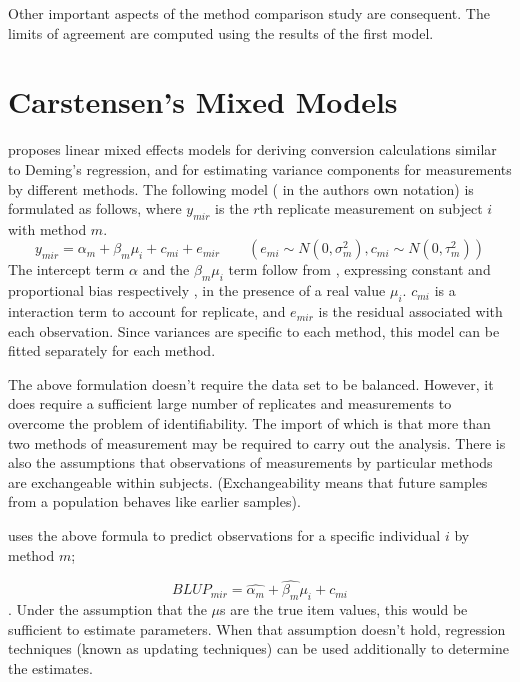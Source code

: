 \documentclass[12pt, a4paper]{report}
\theoremstyle{plain}
\theoremstyle{definition}
\theoremstyle{remark}
\begin{document}
Other important aspects of the method comparison study are consequent. The limits of agreement are computed using the results of the first model.

\newpage
\section{Carstensen's Mixed Models}

\citet{BXC2004} proposes linear mixed effects models for deriving
conversion calculations similar to Deming's regression, and for
estimating variance components for measurements by different
methods. The following model ( in the authors own notation) is
formulated as follows, where $y_{mir}$ is the $r$th replicate
measurement on subject $i$ with method $m$.
\begin{equation}
y_{mir}  = \alpha_{m} + \beta_{m}\mu_{i} + c_{mi} + e_{mir} \qquad
( e_{mi} \sim N(0,\sigma^{2}_{m}), c_{mi} \sim N(0,\tau^{2}_{m}))
\end{equation}
The intercept term $\alpha$ and the $\beta_{m}\mu_{i}$ term follow
from \citet{DunnSEME}, expressing constant and proportional bias
respectively , in the presence of a real value $\mu_{i}.$
$c_{mi}$ is a interaction term to account for replicate, and
$e_{mir}$ is the residual associated with each observation.
Since variances are specific to each method, this model can be
fitted separately for each method.



The above formulation doesn't require the data set to be balanced.
However, it does require a sufficient large number of replicates
and measurements to overcome the problem of identifiability. The
import of which is that more than two methods of measurement may
be required to carry out the analysis. There is also the
assumptions that observations of measurements by particular
methods are exchangeable within subjects. (Exchangeability means
that future samples from a population behaves like earlier
samples).



\citet{BXC2004} uses the above formula to predict observations for
a specific individual $i$ by method $m$;

\begin{equation}BLUP_{mir} = \hat{\alpha_{m}} + \hat{\beta_{m}}\mu_{i} +
c_{mi} \end{equation}. Under the assumption that the $\mu$s are
the true item values, this would be sufficient to estimate
parameters. When that assumption doesn't hold, regression
techniques (known as updating techniques) can be used additionally
to determine the estimates. 
\end{document}
